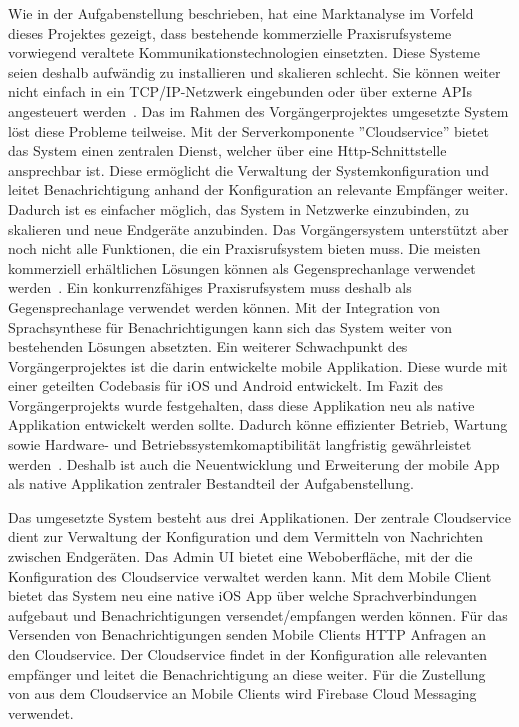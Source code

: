 Wie in der Aufgabenstellung beschrieben, hat eine Marktanalyse im Vorfeld dieses Projektes gezeigt, dass bestehende kommerzielle Praxisrufsysteme vorwiegend veraltete Kommunikationstechnologien einsetzten.
Diese Systeme seien deshalb aufwändig zu installieren und skalieren schlecht.
Sie können weiter nicht einfach in ein TCP/IP-Netzwerk eingebunden oder über externe APIs angesteuert werden~\cite{aufgabenstellung}.
Das im Rahmen des Vorgängerprojektes umgesetzte System löst diese Probleme teilweise.
Mit der Serverkomponente ''Cloudservice'' bietet das System einen zentralen Dienst, welcher über eine Http-Schnittstelle ansprechbar ist.
Diese ermöglicht die Verwaltung der Systemkonfiguration und leitet Benachrichtigung anhand der Konfiguration an relevante Empfänger weiter.
Dadurch ist es einfacher möglich, das System in Netzwerke einzubinden, zu skalieren und neue Endgeräte anzubinden.
Das Vorgängersystem unterstützt aber noch nicht alle Funktionen, die ein Praxisrufsystem bieten muss.
Die meisten kommerziell erhältlichen Lösungen können als Gegensprechanlage verwendet werden~\cite{aufgabenstellung}.
Ein konkurrenzfähiges Praxisrufsystem muss deshalb als Gegensprechanlage verwendet werden können.
Mit der Integration von Sprachsynthese für Benachrichtigungen kann sich das System weiter von bestehenden Lösungen absetzten.
Ein weiterer Schwachpunkt des Vorgängerprojektes ist die darin entwickelte mobile Applikation.
Diese wurde mit einer geteilten Codebasis für iOS und Android entwickelt.
Im Fazit des Vorgängerprojekts wurde festgehalten, dass diese Applikation neu als native Applikation entwickelt werden sollte.
Dadurch könne effizienter Betrieb, Wartung sowie Hardware- und Betriebssystemkomaptibilität langfristig gewährleistet werden~\cite{ip5}.
Deshalb ist auch die Neuentwicklung und Erweiterung der mobile App als native Applikation zentraler Bestandteil der Aufgabenstellung.

Das umgesetzte System besteht aus drei Applikationen.
Der zentrale Cloudservice dient zur Verwaltung der Konfiguration und dem Vermitteln von Nachrichten zwischen Endgeräten.
Das Admin UI bietet eine Weboberfläche, mit der die Konfiguration des Cloudservice verwaltet werden kann.
Mit dem Mobile Client bietet das System neu eine native iOS App über welche Sprachverbindungen aufgebaut und Benachrichtigungen versendet/empfangen werden können.
Für das Versenden von Benachrichtigungen senden Mobile Clients HTTP Anfragen an den Cloudservice.
Der Cloudservice findet in der Konfiguration alle relevanten empfänger und leitet die Benachrichtigung an diese weiter.
Für die Zustellung von aus dem Cloudservice an Mobile Clients wird Firebase Cloud Messaging verwendet.

